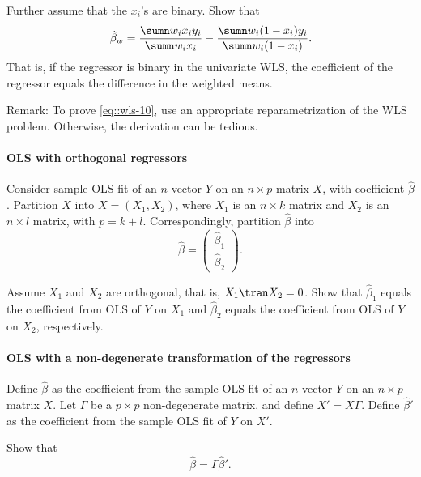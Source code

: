 Further assume that the $x_i$'s are binary. Show that  
\begin{eqnarray}\label{eq::wls-10}
\hat \beta_w  = \frac{ \sumn  w_i  x_i  y_i  }{ \sumn w_i  x_i  } - \frac{ \sumn w_i  (1-x_i)  y_i  }{ \sumn w_i  (1-x_i)  }.
\end{eqnarray}
That is, if the regressor is binary in the univariate WLS, the coefficient of the regressor equals the difference in the weighted means. 


Remark: To prove \eqref{eq::wls-10}, use an appropriate reparametrization of the WLS problem. Otherwise, the derivation can be tedious. 




\paragraph{OLS with orthogonal regressors}\label{hw::ols-orthogonal}


Consider sample OLS fit of an $n$-vector $Y$ on an $n\times p$ matrix $X $, with coefficient $\hat{\beta}$. Partition $X$ into $X = (X_1, X_2)$, where $X_1$ is an $n\times k$ matrix and $X_2$ is an $n\times l$ matrix, with $p=k+l$. Correspondingly, partition $\hat{\beta}$ into 
$$
\hat{\beta} = \begin{pmatrix}
\hat{\beta}_1\\
\hat{\beta}_2
\end{pmatrix} . 
$$


Assume $X_1$ and $X_2$ are orthogonal, that is, $X_1\tran X_2 = 0$. Show that $\hat{\beta}_1$ equals the coefficient from OLS of $Y$ on $X_1$ and $\hat{\beta}_2$ equals the coefficient from OLS of $Y$ on $X_2$, respectively. 





\paragraph{OLS with a non-degenerate transformation of the regressors}\label{hw::ols-transform-regressors}



Define $\hat{\beta}$ as the coefficient from the sample OLS fit of an $n$-vector $Y$ on an $n\times p$ matrix $X $. 
Let $\Gamma$ be a $p\times p$ non-degenerate matrix, and define $X' = X\Gamma$. 
Define $\hat{\beta} ' $ as the coefficient from the sample OLS fit of  $Y$ on $X' $. 

Show that 
$$
 \hat{\beta}  =  \Gamma\hat{\beta} ' .
$$



